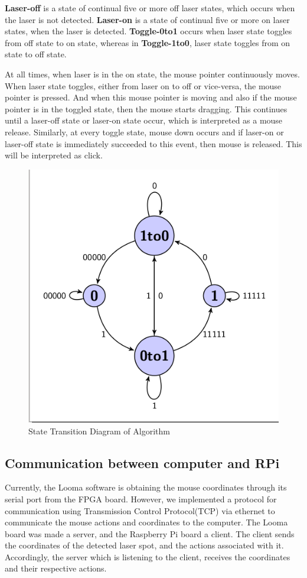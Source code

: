 \documentclass[12pt, a4paper]{article}
\begin{document}
	\textbf {Laser-off} is a state of continual five or more off laser states, which occurs when the laser is not detected. \textbf{Laser-on} is a state of continual five or more on laser states, when the laser is detected. \textbf{Toggle-0to1} occurs when laser state toggles from off state to on state, whereas in \textbf{Toggle-1to0}, laser state toggles from on state to off state. 
	
	At all times, when laser is in the on state, the mouse pointer continuously moves. When laser state toggles, either from laser on to off or vice-versa, the mouse pointer is pressed. And when this mouse pointer is moving and also if the mouse pointer is in the toggled state, then the mouse starts dragging. This continues until a laser-off state or laser-on state occur, which is interpreted as a mouse release. Similarly, at every toggle state, mouse down occurs and if laser-on or laser-off state is immediately succeeded to this event, then mouse is released. This will be interpreted as click.
	
\begin{figure}[htp]
\centering
\includegraphics[scale=0.3]{state.png}
\caption{State Transition Diagram of Algorithm}
\label{}
\end{figure}
	
\subsection{Communication between computer and RPi}
	Currently, the Looma software is obtaining the mouse coordinates through its serial port from the FPGA board. However, we implemented a protocol for communication using Transmission Control Protocol(TCP) via ethernet to communicate the mouse actions and coordinates to the computer. The Looma board was made a server, and the Raspberry Pi board a client. The client sends the coordinates of the detected laser spot, and the actions associated with it. Accordingly, the server which is listening to the client, receives the coordinates and their respective actions. 
\end{document}
